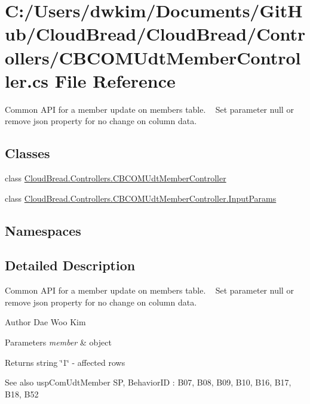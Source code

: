 \hypertarget{a00209}{}\section{C\+:/\+Users/dwkim/\+Documents/\+Git\+Hub/\+Cloud\+Bread/\+Cloud\+Bread/\+Controllers/\+C\+B\+C\+O\+M\+Udt\+Member\+Controller.cs File Reference}
\label{a00209}


Common A\+PI for a member update on members table. ~\newline
Set parameter null or remove json property for no change on column data.  


\subsection*{Classes}
\begin{DoxyCompactItemize}
\item 
class \hyperlink{a00036}{Cloud\+Bread.\+Controllers.\+C\+B\+C\+O\+M\+Udt\+Member\+Controller}
\item 
class \hyperlink{a00097}{Cloud\+Bread.\+Controllers.\+C\+B\+C\+O\+M\+Udt\+Member\+Controller.\+Input\+Params}
\end{DoxyCompactItemize}
\subsection*{Namespaces}
\begin{DoxyCompactItemize}
\end{DoxyCompactItemize}


\subsection{Detailed Description}
Common A\+PI for a member update on members table. ~\newline
Set parameter null or remove json property for no change on column data. 

\begin{DoxyAuthor}{Author}
Dae Woo Kim 
\end{DoxyAuthor}

\begin{DoxyParams}{Parameters}
{\em member} & object \\
\hline
\end{DoxyParams}
\begin{DoxyReturn}{Returns}
string \char`\"{}1\char`\"{} -\/ affected rows 
\end{DoxyReturn}
\begin{DoxySeeAlso}{See also}
usp\+Com\+Udt\+Member SP, Behavior\+ID \+: B07, B08, B09, B10, B16, B17, B18, B52 
\end{DoxySeeAlso}
